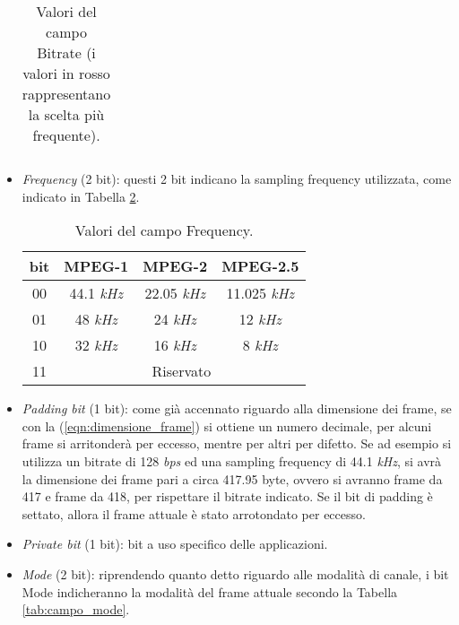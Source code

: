 \begin{itemize}
\begin{table}[h!]
\begin{tabular}{c|c|c|c|c|c|c|}
					\end{tabular}
					\caption[Valori del campo Bitrate.]{Valori del campo Bitrate (i valori in rosso rappresentano la scelta più frequente).}
					\label{tab:campo_bitrate}
				\end{table}
			
			\item \textit{Frequency} (2 bit): questi 2 bit indicano la sampling frequency utilizzata, come indicato in Tabella \ref{tab:campo_frequency}.
			
				\begin{table}[h!]
					\centering
					\begin{tabular}{|c|c|c|c|}
						\multicolumn{1}{c}{\textbf{bit}} & \multicolumn{1}{c}{\textbf{MPEG-1}} & \multicolumn{1}{c}{\textbf{MPEG-2}} & \multicolumn{1}{c}{\textbf{MPEG-2.5}}\\
						\hline
						00 & 44.1 \textit{kHz} & 22.05 \textit{kHz} & 11.025 \textit{kHz}\\
						\hline
						01 & 48 \textit{kHz} & 24 \textit{kHz} & 12 \textit{kHz}\\
						\hline
						10 & 32 \textit{kHz} & 16 \textit{kHz} & 8 \textit{kHz}\\
						\hline
						11 & \multicolumn{3}{|c|}{Riservato}\\
						\hline
					\end{tabular}
					\caption{Valori del campo Frequency.}
					\label{tab:campo_frequency}
				\end{table}
			
			\item \textit{Padding bit} (1 bit): come già accennato riguardo alla dimensione dei frame, se con la (\ref{eqn:dimensione_frame}) si ottiene un numero decimale, per alcuni frame si arritonderà per eccesso, mentre per altri per difetto. Se ad esempio si utilizza un bitrate di 128 \textit{bps} ed una sampling frequency di 44.1 \textit{kHz}, si avrà la dimensione dei frame pari a circa 417.95 byte, ovvero si avranno frame da 417 e frame da 418, per rispettare il bitrate indicato. Se il bit di padding è settato, allora il frame attuale è stato arrotondato per eccesso.
			
			\item \textit{Private bit} (1 bit): bit a uso specifico delle applicazioni.
			
			\item \textit{Mode} (2 bit): riprendendo quanto detto riguardo alle modalità di canale, i bit Mode indicheranno la modalità del frame attuale secondo la Tabella \ref{tab:campo_mode}.
			

\end{itemize}
